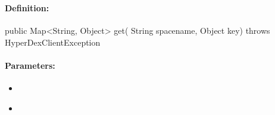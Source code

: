 %
%
%


\pagebreak
\subsubsection{}
\label{api:java:get}


\paragraph{Definition:}
\begin{javacode}
public Map<String, Object> get(
        String spacename,
        Object key) throws HyperDexClientException
\end{javacode}

\paragraph{Parameters:}
\begin{itemize}[noitemsep]
\item {}\\

\item {}\\

\end{itemize}

